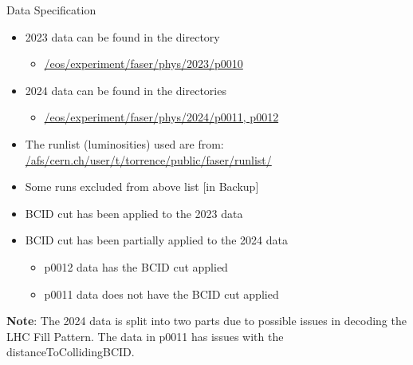 \begin{frame}{Data Specification}
    \begin{itemize}
        \item 2023 data can be found in the directory
        \begin{itemize}
            \item \href{/eos/experiment/faser/phys/2023/p0010}{/eos/experiment/faser/phys/2023/p0010}
        \end{itemize}
        \item 2024 data can be found in the directories
        \begin{itemize}
            \item \href{/eos/experiment/faser/phys/2024/p0011, p0012}{/eos/experiment/faser/phys/2024/p0011, p0012}
        \end{itemize}
        \item The runlist (luminosities) used are from:
        \href{/afs/cern.ch/user/t/torrence/public/faser/runlist/2024/faser runlist 2024 stable.csv}{/afs/cern.ch/user/t/torrence/public/faser/runlist/}
        \item Some runs excluded from above list [in Backup]
        \item BCID cut has been applied to the  2023 data
        \item BCID cut has been partially applied to the 2024 data
        \begin{itemize}
            \item p0012 data has the BCID cut applied
            \item p0011 data does not have the BCID cut applied
        \end{itemize}
    \end{itemize}
    
    {\scriptsize \textbf{Note}: The 2024 data is split into two parts due to possible issues in decoding the LHC Fill Pattern. The data in p0011 has issues with the distanceToCollidingBCID.}
\end{frame}

